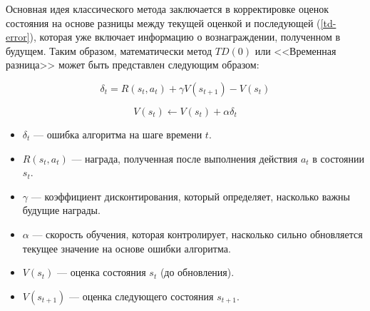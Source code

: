 Основная идея классического метода заключается в корректировке оценок состояния на основе разницы между текущей оценкой и последующей (\ref{td-error}), которая уже включает информацию о вознаграждении, полученном в будущем. Таким образом, математически метод $TD(0)$ или <<Временная разница>> может быть представлен следующим образом:

\pagebreak

\begin{equation}\label{td-error}
    \delta_t = R(s_t, a_t) + \gamma V(s_{t+1}) - V(s_t)
\end{equation}

\begin{equation}\label{td-base}
    V(s_t) \leftarrow V(s_t) + \alpha \delta_t
\end{equation}

\begin{itemize}
    \item $\delta_t$ --- ошибка алгоритма на шаге времени $t$.
    \item $R(s_t, a_t)$ --- награда, полученная после выполнения действия $a_t$ в состоянии $s_t$.
    \item $\gamma$ --- коэффициент дисконтирования, который определяет, насколько важны будущие награды.
    \item $\alpha$ — скорость обучения, которая контролирует, насколько сильно обновляется текущее значение на основе ошибки алгоритма.
    \item $V(s_t)$ --- оценка состояния $s_t$ (до обновления).
    \item $V(s_{t+1})$ --- оценка следующего состояния $s_{t+1}$.
\end{itemize}
